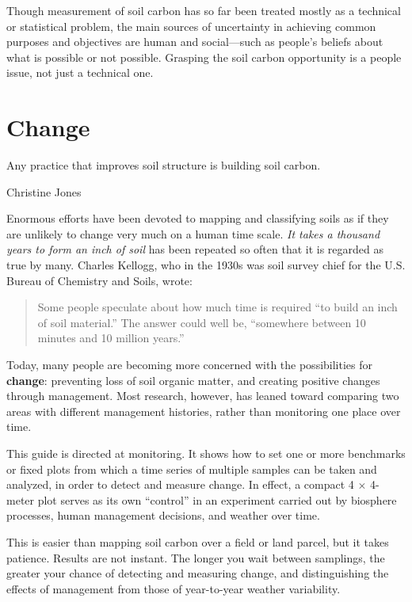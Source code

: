 \documentclass[11pt,letterpaper,oneside,onecolumn]{memoir}
\begin{document}
Though measurement of soil carbon has so far been treated mostly as a technical or statistical problem, the main sources of uncertainty in achieving common purposes and objectives are human and social---such as people's beliefs about what is possible or not possible. Grasping the soil carbon opportunity is a people issue, not just a technical one.

\section{Change}

\epigraph{Any practice that improves soil structure is building soil carbon.}{Christine Jones}

\noindent Enormous efforts have been devoted to mapping and classifying soils as if they are unlikely to change very much on a human time scale. \textit{It takes a thousand years to form an inch of soil} has been repeated so often that it is regarded as true by many. Charles Kellogg, who in the 1930s was soil survey chief for the U.S. Bureau of Chemistry and Soils, wrote:

\begin{quotation}\noindent Some people speculate about how much time is required ``to build an inch of soil material.'' The answer could well be, ``somewhere between 10 minutes and 10 million years.''\end{quotation}

Today, many people are becoming more concerned with the possibilities for \textbf{change}: preventing loss of soil organic matter, and creating positive changes through management. Most research, however, has leaned toward comparing two areas with different management histories, rather than monitoring one place over time.

This guide is directed at monitoring. It shows how to set one or more benchmarks or fixed plots from which a time series of multiple samples can be taken and analyzed, in order to detect and measure change. In effect, a compact 4 $\times$ 4-meter plot serves as its own ``control'' in an experiment carried out by biosphere processes, human management decisions, and weather over time.

This is easier than mapping soil carbon over a field or land parcel, but it takes patience. Results are not instant. The longer you wait between samplings, the greater your chance of detecting and measuring change, and distinguishing the effects of management from those of year-to-year weather variability.
\end{document}
